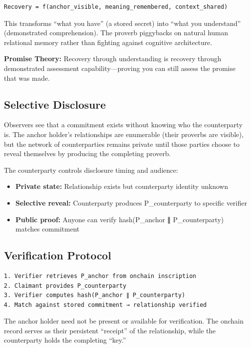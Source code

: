 \documentclass[
]{article}
\providecommand{\tightlist}{%
  \setlength{\itemsep}{0pt}\setlength{\parskip}{0pt}}
\begin{document}
\begin{verbatim}
Recovery = f(anchor_visible, meaning_remembered, context_shared)
\end{verbatim}

This transforms ``what you have'' (a stored secret) into ``what you
understand'' (demonstrated comprehension). The proverb piggybacks on
natural human relational memory rather than fighting against cognitive
architecture.

\textbf{Promise Theory:} Recovery through understanding is recovery
through demonstrated assessment capability---proving you can still
assess the promise that was made.

\subsection{Selective Disclosure}\label{selective-disclosure}

Observers see that a commitment exists without knowing who the
counterparty is. The anchor holder's relationships are enumerable (their
proverbs are visible), but the network of counterparties remains private
until those parties choose to reveal themselves by producing the
completing proverb.

The counterparty controls disclosure timing and audience:

\begin{itemize}
\tightlist
\item
  \textbf{Private state:} Relationship exists but counterparty identity
  unknown
\item
  \textbf{Selective reveal:} Counterparty produces P\_counterparty to
  specific verifier
\item
  \textbf{Public proof:} Anyone can verify hash(P\_anchor ∥
  P\_counterparty) matches commitment
\end{itemize}

\subsection{Verification Protocol}\label{verification-protocol}

\begin{verbatim}
1. Verifier retrieves P_anchor from onchain inscription
2. Claimant provides P_counterparty
3. Verifier computes hash(P_anchor ∥ P_counterparty)
4. Match against stored commitment → relationship verified
\end{verbatim}

The anchor holder need not be present or available for verification. The
onchain record serves as their persistent ``receipt'' of the
relationship, while the counterparty holds the completing ``key.''
\end{document}
